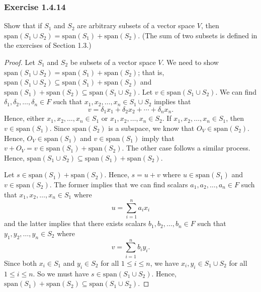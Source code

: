 \subsubsection{Exercise 1.4.14} Show that if \( S_{1}  \) and \( S_{2}  \) are arbitrary subsets of a vector space \( V  \), then \( \text{span}(S_{1} \cup S_{2} ) = \text{span}(S_{1} ) + \text{span}(S_{2})  \). (The sum of two subsets is defined in the exercises of Section 1.3.)
\begin{proof}
Let \( S_{1}  \) and \( S_{2}  \) be subsets of a vector space \( V \). We need to show \( \text{span}(S_{1} \cup S_{2}) = \text{span}(S_{1}) + \text{span}(S_{2}) \); that is, \( \text{span}(S_{1} \cup S_{2}) \subseteq \text{span}(S_{1}) + \text{span}(S_{2}) \) and \( \text{span}(S_{1} ) + \text{span}(S_{2}) \subseteq \text{span}(S_{1} \cup S_{2}) \). Let \( v \in \text{span}(S_{1} \cup S_{2} ) \). We can find \( \delta_{1} , \delta_{2} , \dots, \delta_{n} \in F  \) such that \( x_{1}, x_{2}, \dots, x_{n} \in S_{1} \cup S_{2}  \) implies that  
\[  v = \delta_{1} x_{1} + \delta_{2} x_{2} + \cdots + \delta_{n} x_{n}. \]
Hence, either \( x_{1} , x_{2}, \dots, x_{n} \in S_{1}  \) or \( x_{1}, x_{2} , \dots, x_{n} \in S_{2} \). If \(  x_{1}, x_{2}, \dots, x_{n} \in S_{1}  \), then  \( v \in \text{span}(S_{1}) \). Since \( \text{span}(S_{2})  \) is a subspace, we know that \( O_{V} \in \text{span}(S_{2})  \).  Hence, \( O_{V} \in \text{span}(S_{1}) \) and \( v \in \text{span}(S_{1}) \) imply that \( v + O_{V} = v \in \text{span}(S_{1}) + \text{span}(S_{2})  \). The other case follows a similar process. Hence, \( \text{span}(S_{1} \cup S_{2} ) \subseteq \text{span}(S_{1})  + \text{span}(S_{2})\).

Let \( s \in \text{span}(S_{1}) + \text{span}(S_{2})  \). Hence, \(s = u + v   \) where \( u \in \text{span}(S_{1})\) and \( v \in \text{span}(S_{2}) \). The former implies that we can find scalars \( a_{1}, a_{2}, \dots, a_{n} \in F    \) such that \( x_{1}, x_{2} , \dots, x_{n} \in S_{1} \) where  
\[  u = \sum_{ i=1 }^{ n } a_{i} x_{i}  \]
and the latter implies that there exists scalars \( b_{1}, b_{2}, \dots, b_{n} \in F    \) such that  \( y_{1}, y_{2} , \dots, y_{n} \in S_{2} \) where 
\[  v = \sum_{ i=1 }^{ n }b_{i} y_{i}. \] Since both \( x_{i} \in S_{1}  \) and \( y_{i} \in S_{2}  \) for all \( 1 \leq i \leq n  \), we have \(  x_{i}, y_{i} \in S_{1} \cup S_{2} \) for all \( 1 \leq i \leq n \). So we must have \( s \in \text{span}(S_{1} \cup S_{2})  \). Hence, \( \text{span}(S_{1}) + \text{span}(S_{2}) \subseteq \text{span}(S_{1} \cup S_{2}) \).
\end{proof}

